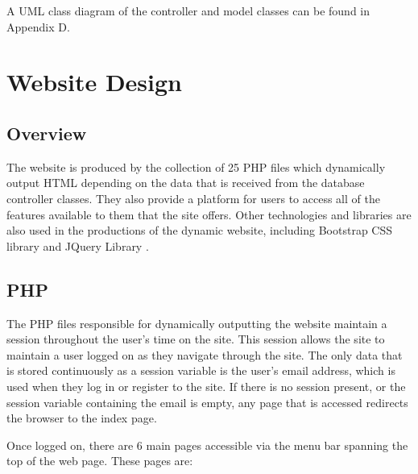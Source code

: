 		A UML class diagram of the controller and model classes can be found in Appendix D. 

		
		
\section{Website Design}
	\subsection{Overview}
		The website is produced by the collection of 25 PHP files which dynamically output HTML depending on the data that is received from the database controller classes. They also provide a platform for users to access all of the features available to them that the site offers. Other technologies and libraries are also used in the productions of the dynamic website, including Bootstrap CSS library \cite{bootstrap_css} and JQuery Library \cite{jquery_library}.
		
	\subsection{PHP}
		The PHP files responsible for dynamically outputting the website maintain a session throughout the user's time on the site. This session allows the site to maintain a user logged on as they navigate through the site. The only data that is stored continuously as a session variable is the user's email address, which is used when they log in or register to the site. If there is no session present, or the session variable containing the email is empty, any page that is accessed redirects the browser to the index page.
		
		Once logged on, there are 6 main pages accessible via the menu bar spanning the top of the web page. These pages are: 

